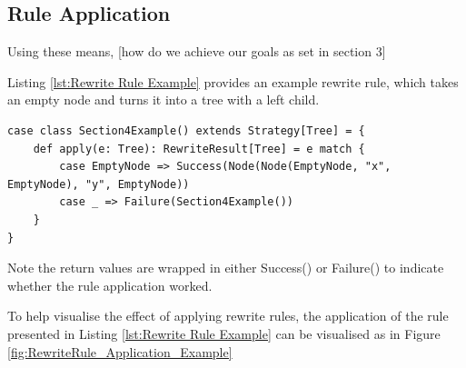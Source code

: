 \documentclass{l4proj}
\begin{document}
\subsection{Rule Application}

Using these means, [how do we achieve our goals as set in section 3]





Listing \ref{lst:Rewrite Rule Example} provides an example rewrite rule, which takes an empty node and turns it into a tree with a left child.

\begin{lstlisting}[caption={A Rewrite rule which takes an Empty node, and replaces it with a Node with one left child}, label={lst:Rewrite Rule Example}]
case class Section4Example() extends Strategy[Tree] = {
    def apply(e: Tree): RewriteResult[Tree] = e match {
        case EmptyNode => Success(Node(Node(EmptyNode, "x", EmptyNode), "y", EmptyNode))
        case _ => Failure(Section4Example())
    }
}
\end{lstlisting}

Note the return values are wrapped in either Success() or Failure() to indicate whether the rule application worked.



To help visualise the effect of applying rewrite rules, the application of the rule presented in Listing \ref{lst:Rewrite Rule Example} can be visualised as in Figure \ref{fig:RewriteRule_Application_Example}
\end{document}
